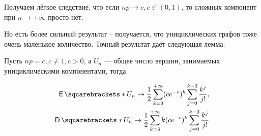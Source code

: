 Получаем лёгкое следствие, что если $np \to c, c \in (0, 1)$, то сложных компонент
при $n \to +\infty$ просто нет.

Но есть более сильный результат -- получается, что унициклических графов тоже
очень маленькое количество. Точный результат даёт следующая лемма:

\begin{lemma}
  Пусть $np = c, c \neq 1, c > 0$, а $U_n$ --- общее число вершин, занимаемых
  унициклическими компонентами, тогда

  \[
    \begin{aligned}
      \E{U_n} \to \frac12 \sum\limits_{k = 3}^{+\infty} (ce^{-c})^k\sum\limits_{j = 0}^{k - 3} \frac{k^j}{j!},\\
      \D{U_n} \to \frac12 \sum\limits_{k = 3}^{+\infty} k(ce^{-c})^k\sum\limits_{j = 0}^{k - 3} \frac{k^j}{j!}
    \end{aligned}
  \]
\end{lemma}

